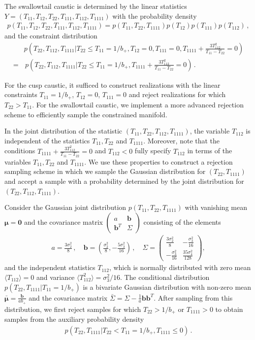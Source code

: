 \documentclass[a4paper, 11pt]{article}
\begin{document}
The swallowtail caustic is determined by the linear statistics $Y=(T_{11},T_{12},T_{22},T_{111},T_{112},T_{1111})$ with the probability density
\begin{align}
p(T_{11},T_{12},T_{22},T_{111},T_{112},T_{1111})=p(T_{11},T_{22},T_{1111})p(T_{12})p(T_{111})p(T_{112})\,,
\end{align}
and the constraint distribution 
\begin{align}
&p\left(T_{22},T_{112},T_{1111}|T_{22}\leq T_{11}=1/b_+, T_{12}=0,T_{111}=0,T_{1111}+\frac{3T_{112}^2}{T_{11}-T_{22}}=0\right)\\
=&\, p\left(T_{22},T_{112}, T_{1111}|T_{22}\leq T_{11}=1/b_+, T_{1111}+\frac{3T_{112}^2}{T_{11}-T_{22}}=0\right)\,.
\end{align}

For the cusp caustic, it sufficed to construct realizations with the linear constraints $T_{11}=1/b_+$, $T_{12}=0$, $T_{111}=0$ and reject realizations for which $T_{22} > T_{11}$. For the swallowtail caustic, we implement a more advanced rejection scheme to efficiently sample the constrained manifold.

In the joint distribution of the statistic $(T_{11},T_{22},T_{112},T_{1111})$, the variable $T_{112}$ is independent of the statistics $T_{11}, T_{22}$ and $T_{1111}$. Moreover, note that the conditions $T_{1111}+\frac{3T_{112}^2}{T_{11}-T_{22}}=0$ and $T_{112}<0$ fully specify $T_{112}$ in terms of the variables $T_{11},T_{22}$ and $T_{1111}$. We use these properties to construct a rejection sampling scheme in which we sample the Gaussian distribution for $(T_{22},T_{1111})$ and accept a sample with a probability determined by the joint distribution for $(T_{22},T_{112},T_{1111})$.

Consider the Gaussian joint distribution $p(T_{11},T_{22},T_{1111})$ with vanishing mean $\bm{\mu}=\bm{0}$ and the covariance matrix $\begin{pmatrix} a & \bm{b} \\ \bm{b}^T & \Sigma \end{pmatrix}$ consisting of the elements
\begin{align}
a=\frac{3 \sigma_2^2}{8}\,, \quad
\bm{b}=\left(\frac{\sigma_2^2}{8}, -\frac{5 \sigma_3^2}{16}\right)\,,\quad
\Sigma = \begin{pmatrix} \frac{3 \sigma_2^2}{8} & -\frac{\sigma_3^2}{16} \\ -\frac{\sigma_3^2}{16} & \frac{35 \sigma_4^2}{128}\end{pmatrix}, 
\end{align}
and the independent statistics $T_{112}$, which is normally distributed with zero mean $\langle T_{112}\rangle = 0$ and variance $\langle T_{112}^2\rangle = \sigma_3^2/16$. The conditional distribution $p(T_{22},T_{1111}|T_{11}=1/b_+)$ is a bivariate Gaussian distribution with non-zero mean $\bar{\bm{\mu}}=\frac{\bm{b}}{a b_+}$ and the covariance matrix $\bar{\Sigma}=\Sigma -\frac{1}{a} \bm{b}\bm{b}^T$. After sampling from this distribution, we first reject samples for which $T_{22}>1/b_+$ or $T_{1111}>0$ to obtain samples from the auxiliary probability density 
\begin{align}
p(T_{22},T_{1111}| T_{22} < T_{11}=1/b_+,T_{1111}\leq 0)\,.
\end{align}
\end{document}
